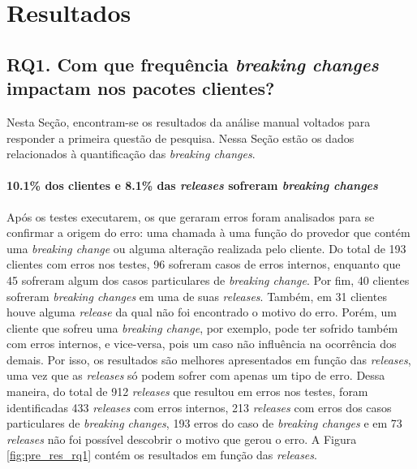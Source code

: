 \chapter{Resultados}
\label{cap:results}

\section{RQ1. Com que frequência \textit{breaking changes} impactam nos pacotes clientes?}

Nesta Seção, encontram-se os resultados da análise manual voltados para responder a primeira questão de pesquisa. Nessa Seção estão os dados relacionados à quantificação das \textit{breaking changes}.

\subsubsection{\textbf{10.1\% dos clientes e 8.1\% das \textit{releases} sofreram \textit{breaking changes}}}

Após os testes executarem, os que geraram erros foram analisados para se confirmar a origem do erro: uma chamada à uma função do provedor que contém uma \textit{breaking change} ou alguma alteração realizada pelo cliente. Do total de 193 clientes com erros nos testes, 96 sofreram casos de erros internos, enquanto que 45 sofreram algum dos casos particulares de \textit{breaking change}. Por fim, 40 clientes sofreram \textit{breaking changes} em uma de suas \textit{releases}. Também, em 31 clientes houve alguma \textit{release} da qual não foi encontrado o motivo do erro. Porém, um cliente que sofreu uma \textit{breaking change}, por exemplo, pode ter sofrido também com erros internos, e vice-versa, pois um caso não influência na ocorrência dos demais. Por isso, os resultados são melhores apresentados em função das \textit{releases}, uma vez que as \textit{releases} só podem sofrer com apenas um tipo de erro. Dessa maneira, do total de 912 \textit{releases} que resultou em erros nos testes, foram identificadas 433 \textit{releases} com erros internos, 
213 \textit{releases} com erros dos casos particulares de \textit{breaking changes}, 193 erros do caso de \textit{breaking changes} e em 73 \textit{releases} não foi possível descobrir o motivo que gerou o erro. A Figura \ref{fig:pre_res_rq1} contém os resultados em função das \textit{releases}.


